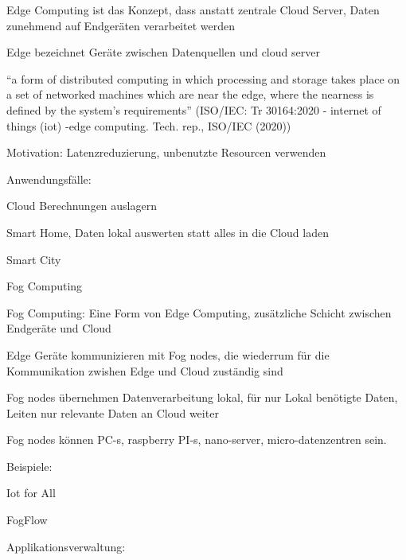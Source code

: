 \begin{notes}
\begin{notes}
\begin{notes}
            \item Edge Computing ist das Konzept, dass anstatt zentrale Cloud Server, Daten zunehmend auf Endgeräten verarbeitet werden \cite{Shi2016}
            \item Edge bezeichnet Geräte zwischen Datenquellen und cloud server
            \item “a form of distributed computing in which processing and storage takes place on a set of networked machines which are near the edge, where the nearness is defined by the system’s requirements”  (ISO/IEC: Tr 30164:2020 - internet of things (iot) -edge computing. Tech. rep., ISO/IEC (2020))
            \item Motivation: Latenzreduzierung, unbenutzte Resourcen verwenden
            \item Anwendungsfälle:
            \begin{notes}
                \item Cloud Berechnungen auslagern
                \item Smart Home, Daten lokal auswerten statt alles in die Cloud laden
                \item Smart City
            \end{notes}
        \end{notes}
        \item Fog Computing
        \begin{notes} 
            \item Fog Computing: Eine Form von Edge Computing, zusätzliche Schicht zwischen Endgeräte und Cloud
            \item Edge Geräte kommunizieren mit Fog nodes, die wiederrum für die Kommunikation zwishen Edge und Cloud zuständig sind
            \item Fog nodes übernehmen Datenverarbeitung lokal, für nur Lokal benötigte Daten, Leiten nur relevante Daten an Cloud weiter
            \item Fog nodes können PC-s, raspberry PI-s, nano-server, micro-datenzentren sein. \cite{Mahmud2020}
            \item Beispiele:
            \begin{notes} 
                \item Iot for All
                \item FogFlow
            \end{notes}
            \item Applikationsverwaltung:
            \begin{notes}

\end{notes}
\end{notes}
\end{notes}
\end{notes}
